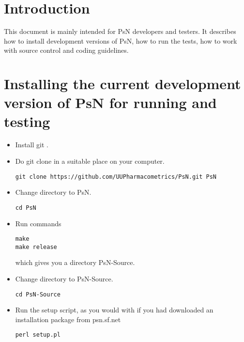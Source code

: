 
\usepackage{hyperref}



\maketitle

  
\section{Introduction}

This document is mainly intended for PsN developers and testers. It describes how to install development versions of PsN, how to run the tests, how to work with source control and coding guidelines.

\section{Installing the current development version of PsN for running and testing}
\begin{itemize}
\item Install git \cite{git}. 
\item Do git clone in a suitable place on your computer.
\begin{verbatim}
git clone https://github.com/UUPharmacometrics/PsN.git PsN
\end{verbatim}
\item Change directory to PsN.
\begin{verbatim}
cd PsN
\end{verbatim}
\item Run commands 
\begin{verbatim}
make
make release
\end{verbatim}
\noindent which gives you a directory PsN-Source.
\item Change directory to PsN-Source.
\begin{verbatim}
cd PsN-Source
\end{verbatim}
\item Run the setup script, as you would with if you had downloaded an installation package from psn.sf.net
\begin{verbatim}
perl setup.pl
\end{verbatim}
\end{itemize}

